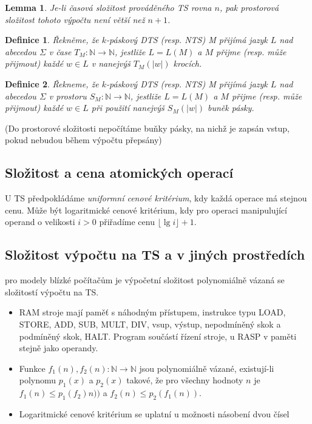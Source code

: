 \documentclass[a4paper, 11pt]{report}
\newtheorem{mydef}{Definice}[chapter]
\newtheorem{lemma}{Lemma}[chapter]
\begin{document}
\begin{lemma}
Je-li časová složitost prováděného TS rovna $n$, pak prostorová složitost tohoto výpočtu není větší než $n+1$.
\end{lemma}

\begin{mydef}
Řekněme, že $k$-páskový DTS (resp. NTS) M přijímá jazyk $L$ nad abecedou $\Sigma$ v čase $T_M: \mathbb{N} \to \mathbb{N}$, jestliže $L = L(M)$ a $M$ přijme (resp. může přijmout) každé $w \in L$ v nanejvýš $T_M(|w|)$ krocích.
\end{mydef}

\begin{mydef}
Řekneme, že $k$-páskový DTS (resp. NTS) M přijímá jazyk $L$ nad abecedou $\Sigma$ v prostoru $S_M: \mathbb{N} \to\mathbb{N}$, jestliže $L = L(M)$ a $M$ přijme (resp. může přijmout) každé $w \in L$ při použití nanejvýš $S_M(|w|)$ buněk pásky.
\end{mydef}
(Do prostorové složitosti nepočítáme buňky pásky, na nichž je zapsán vstup, pokud nebudou během výpočtu přepsány)

\subsection{Složitost a cena atomických operací}
U TS předpokládáme \emph{uniformní cenové kritérium}, kdy každá operace má stejnou cenu.
Může být logaritmické cenové kritérium, kdy pro operaci manipulující operand o velikosti $i > 0$ přiřadíme cenu $\lfloor \lg i \rfloor + 1$.

\subsection{Složitost výpočtu na TS a v jiných prostředích}
pro modely blízké počítačům je výpočetní složitost polynomiálně vázaná se složitostí výpočtu na TS.
\begin{itemize}
	\item RAM stroje mají paměť s náhodným přístupem, instrukce typu LOAD, STORE, ADD, SUB, MULT, DIV, vsup, výstup, nepodmíněný skok a podmíněný skok, HALT. Program součástí řízení stroje, u RASP v paměti stejně jako operandy.
	\item Funkce $f_1(n), f_2(n): \mathbb{N} \to \mathbb{N}$ jsou polynomiálně vázané, existují-li polynomu $p_1(x)$ a $p_2(x)$ takové, že pro všechny hodnoty $n$ je $f_1(n) \leq p_1(f_2)n))$ a $f_2(n) \leq p_2(f_1(n))$.
	\item Logaritmické cenové kritérium se uplatní u možnosti násobení dvou čísel
\end{itemize}
\end{document}
